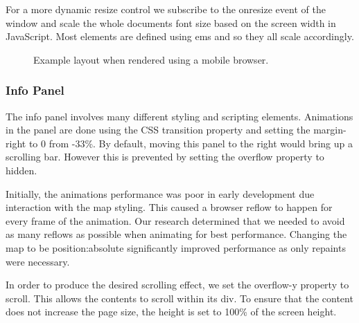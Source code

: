\documentclass[10pt]{article}
\begin{document}
                For a more dynamic resize control we subscribe to the onresize event of the window and scale the whole document\textquotesingle s font size based on the screen width in JavaScript. Most elements are defined using ems and so they all scale accordingly.

                \begin{figure}[!ht]
                  \centering
                  \caption{Example layout when rendered using a mobile browser.}
                \end{figure}

            \subsubsection{Info Panel}
                The info panel involves many different styling and scripting elements. Animations in the panel are done using the CSS transition property and setting the margin-right to 0 from -33\%. By default, moving this panel to the right would bring up a scrolling bar. However this is prevented by setting the overflow property to hidden.

                Initially, the animation\textquotesingle s performance was poor in early development due interaction with the map styling. This caused a browser reflow to happen for every frame of the animation. Our research determined that we needed to avoid as many reflows as possible when animating for best performance. Changing the map to be position:absolute significantly improved performance as only repaints were necessary.

                In order to produce the desired scrolling effect, we set the overflow-y property to scroll. This allows the contents to scroll within its div. To ensure that the content does not increase the page size, the height is set to 100\% of the screen height.
\end{document}
